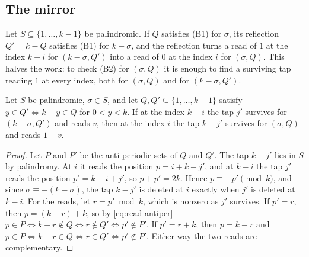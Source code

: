 \subsection{The mirror}

Let $S\subseteq\{1,\dots,k-1\}$ be palindromic. If $Q$ satisfies (B1) for
$\sigma$, its reflection $Q'=k-Q$ satisfies (B1) for $k-\sigma$, and the
reflection turns a read of $1$ at the index $k-i$ for $(k-\sigma,Q')$ into a
read of $0$ at the index $i$ for $(\sigma,Q)$. This halves the work: to check
(B2) for $(\sigma,Q)$ it is enough to find a surviving tap reading $1$ at
every index, both for $(\sigma,Q)$ and for $(k-\sigma,Q')$.

\begin{lemma}
\label{lem:nao-mirror}
Let $S$ be palindromic, $\sigma\in S$, and let $Q,Q'\subseteq\{1,\dots,k-1\}$
satisfy $y\in Q'\iff k-y\in Q$ for $0<y<k$. If at the index $k-i$ the tap
$j'$ survives for $(k-\sigma,Q')$ and reads $v$, then at the index $i$ the tap
$k-j'$ survives for $(\sigma,Q)$ and reads $1-v$.
\end{lemma}

\begin{proof}
Let $P$ and $P'$ be the anti-periodic sets of $Q$ and $Q'$. The tap $k-j'$
lies in $S$ by palindromy. At $i$ it reads the position $p=i+k-j'$, and at
$k-i$ the tap $j'$ reads the position $p'=k-i+j'$, so $p+p'=2k$. Hence
$p\equiv-p'\pmod k$, and since $\sigma\equiv-(k-\sigma)$, the tap $k-j'$ is
deleted at $i$ exactly when $j'$ is deleted at $k-i$. For the reads, let
$r=p'\bmod k$, which is nonzero as $j'$ survives. If $p'=r$, then
$p=(k-r)+k$, so by \eqref{eq:read-antiper}
$p\in P\iff k-r\notin Q\iff r\notin Q'\iff p'\notin P'$. If $p'=r+k$, then
$p=k-r$ and $p\in P\iff k-r\in Q\iff r\in Q'\iff p'\notin P'$. Either way
the two reads are complementary.
\end{proof}
